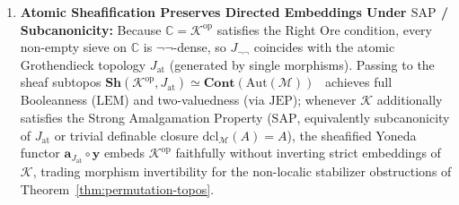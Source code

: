 \begin{theorem}
\begin{enumerate}
  \item \textbf{Atomic Sheafification Preserves Directed Embeddings Under $\mathrm{SAP}$ / Subcanonicity:} Because $\mathbb{C} = \mathcal{K}^{\mathrm{op}}$ satisfies the Right Ore condition, every non-empty sieve on $\mathbb{C}$ is $\neg\neg$-dense, so $J_{\neg\neg}$ coincides with the atomic Grothendieck topology $J_{\mathrm{at}}$ (generated by single morphisms). Passing to the sheaf subtopos $\mathbf{Sh}(\mathcal{K}^{\mathrm{op}}, J_{\mathrm{at}}) \simeq \mathbf{Cont}(\mathrm{Aut}(\mathcal{M}))$~\cite{Caramello18} achieves full Booleanness ($\mathrm{LEM}$) and two-valuedness (via $\mathrm{JEP}$); whenever $\mathcal{K}$ additionally satisfies the Strong Amalgamation Property ($\mathrm{SAP}$, equivalently subcanonicity of $J_{\mathrm{at}}$ or trivial definable closure $\mathrm{dcl}_{\mathcal{M}}(A) = A$), the sheafified Yoneda functor $\mathbf{a}_{J_{\mathrm{at}}} \circ \mathbf{y}$ embeds $\mathcal{K}^{\mathrm{op}}$ faithfully without inverting strict embeddings of $\mathcal{K}$, trading morphism invertibility for the non-localic stabilizer obstructions of Theorem~\ref{thm:permutation-topos}.
\end{enumerate}
\end{theorem}

